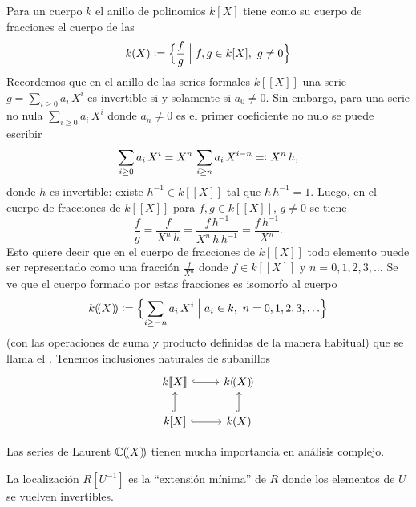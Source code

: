 \begin{ejemplo}
  Para un cuerpo $k$ el anillo de polinomios $k [X]$ tiene como su cuerpo
  de fracciones el cuerpo de las 
  $$k (X) \mathrel{\mathop:}= \Bigl\{ \frac{f}{g} \Bigm| f,g \in k [X], ~ g\ne 0 \Bigr\}$$
  Recordemos que en el anillo de las series formales $k [\![X]\!]$ una serie
  $g = \sum_{i \ge 0} a_i\,X^i$ es invertible si y solamente si $a_0 \ne 0$. Sin
  embargo, para una serie no nula $\sum_{i\ge 0} a_i\,X^i$ donde $a_n \ne 0$ es
  el primer coeficiente no nulo se puede escribir
  $$\sum_{i\ge 0} a_i\,X^i = X^n\,\sum_{i\ge n} a_i\,X^{i-n} =\mathrel{\mathop:} X^n\,h,$$
  donde $h$ es invertible: existe $h^{-1} \in k [\![X]\!]$ tal que
  $h\,h^{-1} = 1$. Luego, en el cuerpo de fracciones de $k [\![X]\!]$ para
  $f,g\in k[\![X]\!]$, $g\ne 0$ se tiene
  \[ \frac{f}{g} =
     \frac{f}{X^n\,h} =
     \frac{f\,h^{-1}}{X^n\,h\,h^{-1}} =
     \frac{f\,h^{-1}}{X^n}. \]
  Esto quiere decir que en el cuerpo de fracciones de $k [\![X]\!]$ todo
  elemento puede ser representado como una fracción $\frac{f}{X^n}$ donde
  $f\in k [\![X]\!]$ y $n = 0,1,2,3,\ldots$ Se ve que el cuerpo formado por
  estas fracciones es isomorfo al cuerpo
  \[ k (\!(X)\!) \mathrel{\mathop:}=
     \Bigl\{ \sum_{i \ge -n} a_i\,X^i \Bigm| a_i\in k, ~ n = 0,1,2,3,\ldots\Bigr\} \]
  (con las operaciones de suma y producto definidas de la manera habitual) que
  se llama el . Tenemos inclusiones naturales de subanillos
  \[ \begin{tikzcd}
      k [\![X]\!] \ar[hookrightarrow]{r} & k (\!(X)\!) \\
      k [X] \ar[hookrightarrow]{r}\ar[hookrightarrow]{u} & k (X)\ar[hookrightarrow]{u}
    \end{tikzcd} \]

  Las series de Laurent $\mathbb{C} (\!(X)\!)$ tienen mucha importancia en análisis
  complejo.
\end{ejemplo}

La localización $R [U^{-1}]$ es la ``extensión mínima'' de $R$ donde
los elementos de $U$ se vuelven invertibles.

